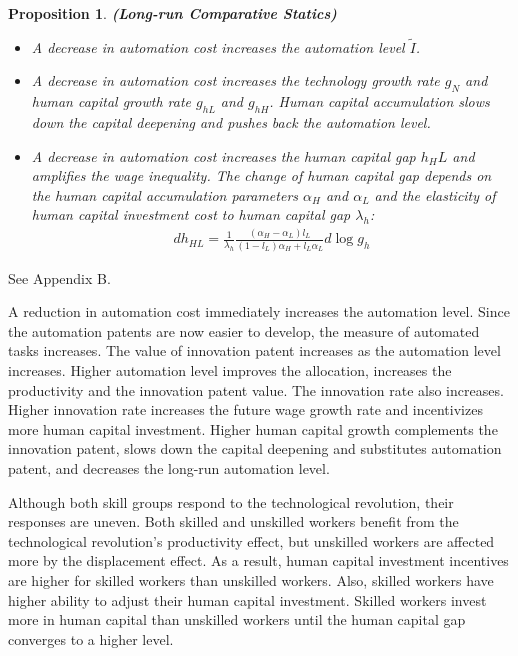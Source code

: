 \documentclass[12pt]{article}
\newtheorem{proposition}{Proposition}
\begin{document}
\begin{proposition}{\bf (Long-run Comparative Statics)} 
\begin{itemize}
\item A decrease in automation cost increases the automation level $\tilde{I}$.
\item A decrease in automation cost increases the technology growth rate $g_N$ and human capital growth rate $g_{hL}$ and $g_{hH}$. Human capital accumulation slows down the capital deepening and pushes back the automation level. 
\item  A decrease in automation cost increases the human capital gap $h_HL$ and amplifies the wage inequality. The change of human capital gap depends on the human capital accumulation parameters $\alpha_H$ and $\alpha_L$ and the elasticity of human capital investment cost to human capital gap $\lambda_h$:
\begin{align*}
dh_{HL} = \frac{1}{\lambda_h}\frac{(\alpha_H-\alpha_L)l_L}{(1-l_L)\alpha_H+l_L\alpha_L}d\log g_h
\end{align*}
\end{itemize}
\end{proposition}
 See Appendix B.

A reduction in automation cost immediately increases the automation level. Since the automation patents are now easier to develop, the measure of automated tasks increases. The value of innovation patent increases as the automation level increases. Higher automation level improves the allocation, increases the productivity and the innovation patent value. The innovation rate also increases. Higher innovation rate increases the future wage growth rate and incentivizes more human capital investment. Higher human capital growth complements the innovation patent, slows down the capital deepening and substitutes automation patent, and decreases the long-run automation level. 

Although both skill groups respond to the technological revolution, their responses are uneven. Both skilled and unskilled workers benefit from the technological revolution's productivity effect, but unskilled workers are affected more by the displacement effect. As a result, human capital investment incentives are higher for skilled workers than unskilled workers. Also, skilled workers have higher ability to adjust their human capital investment. Skilled workers invest more in human capital than unskilled workers until the human capital gap converges to a higher level. 
\end{document}
